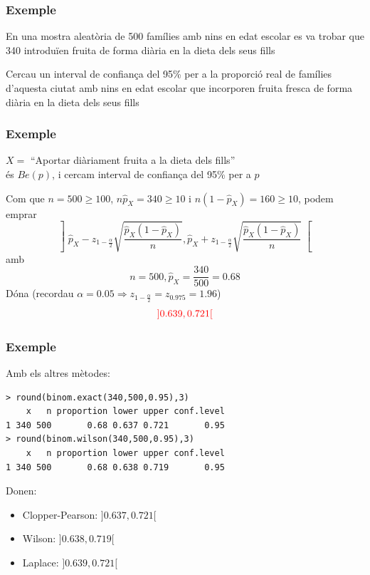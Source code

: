 \documentclass[12pt,t]{beamer}
\newcommand{\red}[1]{\textcolor{red}{#1}}
\renewcommand{\geq}{\geqslant}
\theoremstyle{plain}
\theoremstyle{definition}
\begin{document}
\begin{frame}
\frametitle{Exemple}

En una mostra aleatòria de 500 famílies amb nins en edat escolar es
va trobar que 340 introduïen fruita de forma diària en la dieta dels seus fills
\medskip

Cercau un interval de confiança del 95\% per a la proporció real de
famílies d'aquesta ciutat amb nins en edat escolar que incorporen fruita fresca de
forma diària en la dieta dels seus fills


\end{frame}
\begin{frame}
\frametitle{Exemple}

$X=$ ``Aportar diàriament fruita a la dieta dels fills''\\
 és $Be(p)$, i cercam interval de confiança del 95\% per a $p$
\bigskip

Com que $n=500\geq 100$, $n\widehat{p}_X=340\geq 10$ i $n(1-\widehat{p}_X)=160\geq 10$, podem emprar
$$
\left]\widehat{p}_{X}-z_{1-\frac{\alpha}{2}}\sqrt{\frac{\widehat{p}_{X}
(1-\widehat{p}_{X})}{n}},
\widehat{p}_{X}+z_{1-\frac{\alpha}{2}}\sqrt{\frac{\widehat{p}_{X}
(1-\widehat{p}_{X})}{n}}\right[
$$
amb
$$
n=500, \widehat{p}_{X}=\dfrac{340}{500}=0.68
$$
Dóna (recordau $\alpha=0.05\Rightarrow z_{1-\frac{\alpha}{2}}=z_{0.975}=1.96$)
$$
\red{]0.639,0.721[}
$$

\end{frame}

\begin{frame}[fragile]
\frametitle{Exemple}

Amb els altres mètodes:
\begin{verbatim}
> round(binom.exact(340,500,0.95),3)
    x   n proportion lower upper conf.level
1 340 500       0.68 0.637 0.721       0.95
> round(binom.wilson(340,500,0.95),3)
    x   n proportion lower upper conf.level
1 340 500       0.68 0.638 0.719       0.95
\end{verbatim}
Donen:
\medskip

\begin{itemize}
\item Clopper-Pearson: $]0.637,0.721[$
\medskip

\item Wilson: $]0.638, 0.719[$
\medskip

\item Laplace: $]0.639,0.721[$
\end{itemize}

\end{frame}
\end{document}
